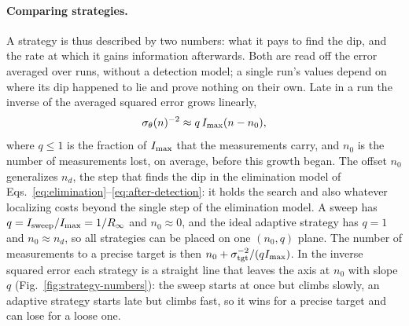 \paragraph{Comparing strategies.} A strategy is thus described by two numbers: what it pays to
find the dip, and the rate at which it gains information afterwards. Both are read off the error averaged over runs,
without a detection model; a single run's values depend on where its dip happened to lie and prove nothing on their
own. Late in a run the inverse of the averaged squared error grows linearly,
\begin{equation}
  \sigma_\theta(n)^{-2}\approx q\,I_{\rm max}(n-n_0),
  \label{eq:strategy-numbers}
\end{equation}
where $q\le1$ is the fraction of $I_{\rm max}$ that the measurements carry, and
$n_0$ is the number of measurements lost, on average, before this growth began. The offset $n_0$ generalizes $n_d$, the step that finds the dip in the elimination model of
Eqs.~\eqref{eq:elimination}--\eqref{eq:after-detection}: it holds the search and also whatever localizing costs
beyond the single step of the elimination model. A sweep has $q=I_{\rm sweep}/I_{\rm max}=1/R_\infty$ and $n_0\approx0$, and the ideal
adaptive strategy has $q=1$ and $n_0\approx n_d$, so all strategies can be placed on one $(n_0,q)$ plane. The number of
measurements to a precise target is then $n_0+\sigma_{\rm tgt}^{-2}/(qI_{\rm max})$. In the inverse squared error
each strategy is a straight line that leaves the axis at $n_0$ with slope $q$ (Fig.~\ref{fig:strategy-numbers}): the
sweep starts at once but climbs slowly, an adaptive strategy starts late but climbs fast, so it wins for a precise
target and can lose for a loose one.

